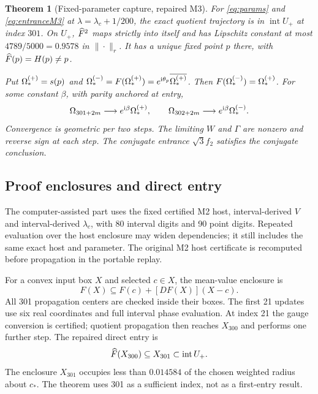 \documentclass[11pt,a4paper]{article}
\newtheorem{theorem}{Theorem}\newtheorem{proposition}[theorem]{Proposition}\newtheorem{lemma}[theorem]{Lemma}
\begin{document}
\begin{theorem}[Fixed-parameter capture, repaired M3]\label{thm:M3}
For \eqref{eq:params} and \eqref{eq:entranceM3} at $\lambda=\lambda_c+1/200$, the exact quotient trajectory is in $\operatorname{int}U_+$ at index $301$. On $U_+$, $\widehat F^2$ maps strictly into itself and has Lipschitz constant at most $4789/5000=0.9578$ in $\|\cdot\|_r$. It has a unique fixed point $p$ there, with $\widehat F(p)=H(p)\ne p$.

Put $\Omega_*^{(+)}=s(p)$ and $\Omega_*^{(-)}=F(\Omega_*^{(+)})=e^{\mathrm i\theta_p}\overline{\Omega_*^{(+)}}$. Then $F(\Omega_*^{(-)})=\Omega_*^{(+)}$. For some constant $\beta$, with parity anchored at entry,
\begin{equation}
 \Omega_{301+2m}\longrightarrow e^{\mathrm i\beta}\Omega_*^{(+)},\qquad
 \Omega_{302+2m}\longrightarrow e^{\mathrm i\beta}\Omega_*^{(-)}.
\label{eq:fulllimit}
\end{equation}
Convergence is geometric per two steps. The limiting $W$ and $\Gamma$ are nonzero and reverse sign at each step. The conjugate entrance $\sqrt3f_2$ satisfies the conjugate conclusion.
\end{theorem}

\subsection{Proof enclosures and direct entry}
The computer-assisted part uses the fixed certified M2 host, interval-derived $V$ and interval-derived $\lambda_c$, with 80 interval digits and 90 point digits. Repeated evaluation over the host enclosure may widen dependencies; it still includes the same exact host and parameter. The original M2 host certificate is recomputed before propagation in the portable replay.

For a convex input box $X$ and selected $c\in X$, the mean-value enclosure is
\begin{equation}
 F(X)\subseteq F(c)+[DF(X)](X-c).\label{eq:meanvalue}
\end{equation}
All 301 propagation centers are checked inside their boxes. The first 21 updates use six real coordinates and full interval phase evaluation. At index 21 the gauge conversion is certified; quotient propagation then reaches $X_{300}$ and performs one further step. The repaired direct entry is
\begin{equation}
 \widehat F(X_{300})\subseteq X_{301}\subset\operatorname{int}U_+.\label{eq:entry}
\end{equation}
The enclosure $X_{301}$ occupies less than $0.014584$ of the chosen weighted radius about $c_*$. The theorem uses 301 as a sufficient index, not as a first-entry result.
\end{document}
